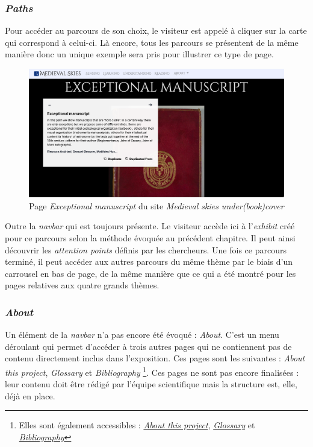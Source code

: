     \subsubsection{\textit{Paths}}
    Pour accéder au parcours de son choix, le visiteur est appelé à cliquer sur la carte qui correspond à celui-ci. Là encore, tous les parcours se présentent de la même manière donc un unique exemple sera pris pour illustrer ce type de page.
    
    \begin{figure}[h]
	\caption{Page \textit{Exceptional manuscript} du site \textit{Medieval skies under(book)cover}}
	\includegraphics[scale=0.3, angle=0]{images/partie3/website/expo-paths-exceptional.png}
    \centering
    \end{figure}
    
    Outre la \textit{navbar} qui est toujours présente. Le visiteur accède ici à l'\textit{exhibit} créé pour ce parcours selon la méthode évoquée au précédent chapitre. Il peut ainsi découvrir les \textit{attention points} définis par les chercheurs. Une fois ce parcours terminé, il peut accéder aux autres parcours du même thème par le biais d'un carrousel en bas de page, de la même manière que ce qui a été montré pour les pages relatives aux quatre grands thèmes.
    
    \subsubsection{\textit{About}}
    Un élément de la \textit{navbar} n'a pas encore été évoqué : \textit{About}. C'est un menu déroulant qui permet d'accéder à trois autres pages qui ne contiennent pas de contenu directement inclus dans l'exposition. Ces pages sont les suivantes : \textit{About this project}, \textit{Glossary} et \textit{Bibliography} \footnote{Elles sont également accessibles : \href{https://alfa-exhibition.herokuapp.com/about}{\textit{About this project}}, \href{https://alfa-exhibition.herokuapp.com/glossary}{\textit{Glossary}} et \href{https://alfa-exhibition.herokuapp.com/bibliography}{\textit{Bibliography}}}. Ces pages ne sont pas encore finalisées : leur contenu doit être rédigé par l'équipe scientifique mais la structure est, elle, déjà en place. 
    
